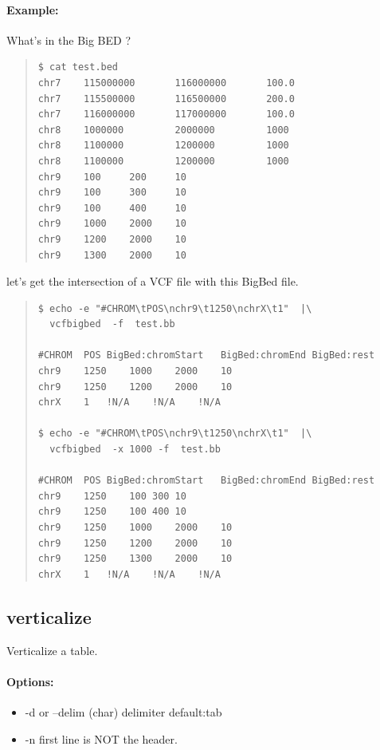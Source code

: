 \documentclass[12pt]{article}
\begin{document}
\paragraph{Example:}
What's in the Big BED ?
\begin{quote}
\begin{verbatim}
$ cat test.bed 
chr7    115000000       116000000       100.0
chr7    115500000       116500000       200.0
chr7    116000000       117000000       100.0
chr8    1000000         2000000         1000
chr8    1100000         1200000         1000
chr8    1100000         1200000         1000
chr9    100     200     10
chr9    100     300     10
chr9    100     400     10
chr9    1000    2000    10
chr9    1200    2000    10
chr9    1300    2000    10
\end{verbatim}
\end{quote}

let's get the intersection of a VCF file with this BigBed file.

\begin{quote}
\begin{verbatim}
$ echo -e "#CHROM\tPOS\nchr9\t1250\nchrX\t1"  |\
  vcfbigbed  -f  test.bb 

#CHROM	POS	BigBed:chromStart	BigBed:chromEnd	BigBed:rest
chr9	1250	1000	2000	10
chr9	1250	1200	2000	10
chrX	1	!N/A	!N/A	!N/A

$ echo -e "#CHROM\tPOS\nchr9\t1250\nchrX\t1"  |\
  vcfbigbed  -x 1000 -f  test.bb 

#CHROM	POS	BigBed:chromStart	BigBed:chromEnd	BigBed:rest
chr9	1250	100	300	10
chr9	1250	100	400	10
chr9	1250	1000	2000	10
chr9	1250	1200	2000	10
chr9	1250	1300	2000	10
chrX	1	!N/A	!N/A	!N/A

\end{verbatim}
\end{quote}

\subsection{verticalize}
Verticalize a table.
\paragraph{Options:}
\begin{itemize}
\item-d or --delim (char) delimiter default:tab
\item-n first line is NOT the header.
\end{itemize}
\end{document}

